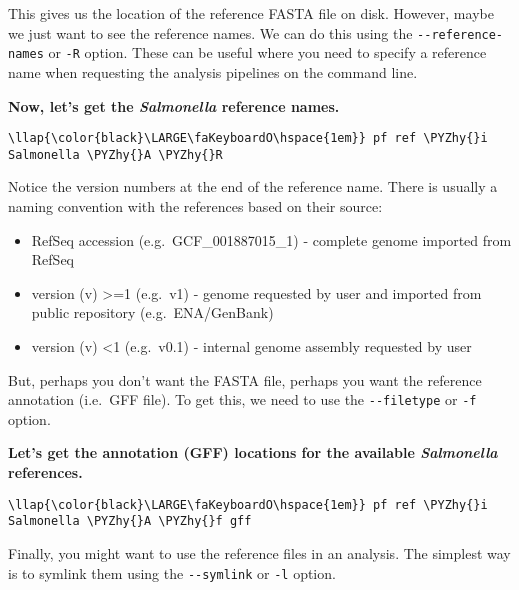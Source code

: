 \documentclass[11pt]{article}
\providecommand{\tightlist}{%
      \setlength{\itemsep}{0pt}\setlength{\parskip}{0pt}}
\def\PYZhy{\char`\-}
\begin{document}
    This gives us the location of the reference FASTA file on disk. However,
maybe we just want to see the reference names. We can do this using the
\texttt{-\/-reference-names} or \texttt{-R} option. These can be useful
where you need to specify a reference name when requesting the analysis
pipelines on the command line.

\textbf{Now, let's get the \textit{Salmonella} reference names.}

\begin{terminalinput}
\begin{Verbatim}[commandchars=\\\{\}]
\llap{\color{black}\LARGE\faKeyboardO\hspace{1em}} pf ref \PYZhy{}i Salmonella \PYZhy{}A \PYZhy{}R
\end{Verbatim}
\end{terminalinput}

    Notice the version numbers at the end of the reference name. There is
usually a naming convention with the references based on their source:

\begin{itemize}
\tightlist
\item
  RefSeq accession (e.g.~GCF\_001887015\_1) - complete genome imported
  from RefSeq
\item
  version (v) \textgreater{}=1 (e.g.~v1) - genome requested by user and
  imported from public repository (e.g.~ENA/GenBank)
\item
  version (v) \textless{}1 (e.g.~v0.1) - internal genome assembly
  requested by user
\end{itemize}

But, perhaps you don't want the FASTA file, perhaps you want the
reference annotation (i.e.~GFF file). To get this, we need to use the
\texttt{-\/-filetype} or \texttt{-f} option.

\textbf{Let's get the annotation (GFF) locations for the available
\textit{Salmonella} references.}

\begin{terminalinput}
\begin{Verbatim}[commandchars=\\\{\}]
\llap{\color{black}\LARGE\faKeyboardO\hspace{1em}} pf ref \PYZhy{}i Salmonella \PYZhy{}A \PYZhy{}f gff
\end{Verbatim}
\end{terminalinput}

    Finally, you might want to use the reference files in an analysis. The
simplest way is to symlink them using the \texttt{-\/-symlink} or
\texttt{-l} option.
\end{document}

